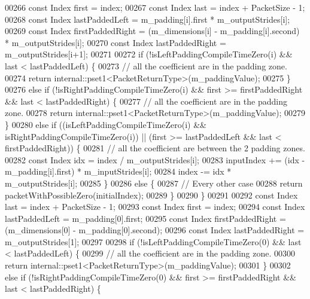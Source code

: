 \begin{DoxyCode}
00266       \textcolor{keyword}{const} Index first = index;
00267       \textcolor{keyword}{const} Index last = index + PacketSize - 1;
00268       \textcolor{keyword}{const} Index lastPaddedLeft = m\_padding[i].first * m\_outputStrides[i];
00269       \textcolor{keyword}{const} Index firstPaddedRight = (m\_dimensions[i] - m\_padding[i].second) * m\_outputStrides[i];
00270       \textcolor{keyword}{const} Index lastPaddedRight = m\_outputStrides[i+1];
00271 
00272       \textcolor{keywordflow}{if} (!isLeftPaddingCompileTimeZero(i) && last < lastPaddedLeft) \{
00273         \textcolor{comment}{// all the coefficient are in the padding zone.}
00274         \textcolor{keywordflow}{return} internal::pset1<PacketReturnType>(m\_paddingValue);
00275       \}
00276       \textcolor{keywordflow}{else} \textcolor{keywordflow}{if} (!isRightPaddingCompileTimeZero(i) && first >= firstPaddedRight && last < lastPaddedRight) \{
00277         \textcolor{comment}{// all the coefficient are in the padding zone.}
00278         \textcolor{keywordflow}{return} internal::pset1<PacketReturnType>(m\_paddingValue);
00279       \}
00280       \textcolor{keywordflow}{else} \textcolor{keywordflow}{if} ((isLeftPaddingCompileTimeZero(i) && isRightPaddingCompileTimeZero(i)) || (first >= 
      lastPaddedLeft && last < firstPaddedRight)) \{
00281         \textcolor{comment}{// all the coefficient are between the 2 padding zones.}
00282         \textcolor{keyword}{const} Index idx = index / m\_outputStrides[i];
00283         inputIndex += (idx - m\_padding[i].first) * m\_inputStrides[i];
00284         index -= idx * m\_outputStrides[i];
00285       \}
00286       \textcolor{keywordflow}{else} \{
00287         \textcolor{comment}{// Every other case}
00288         \textcolor{keywordflow}{return} packetWithPossibleZero(initialIndex);
00289       \}
00290     \}
00291 
00292     \textcolor{keyword}{const} Index last = index + PacketSize - 1;
00293     \textcolor{keyword}{const} Index first = index;
00294     \textcolor{keyword}{const} Index lastPaddedLeft = m\_padding[0].first;
00295     \textcolor{keyword}{const} Index firstPaddedRight = (m\_dimensions[0] - m\_padding[0].second);
00296     \textcolor{keyword}{const} Index lastPaddedRight = m\_outputStrides[1];
00297 
00298     \textcolor{keywordflow}{if} (!isLeftPaddingCompileTimeZero(0) && last < lastPaddedLeft) \{
00299       \textcolor{comment}{// all the coefficient are in the padding zone.}
00300       \textcolor{keywordflow}{return} internal::pset1<PacketReturnType>(m\_paddingValue);
00301     \}
00302     \textcolor{keywordflow}{else} \textcolor{keywordflow}{if} (!isRightPaddingCompileTimeZero(0) && first >= firstPaddedRight && last < lastPaddedRight) \{

\end{DoxyCode}
